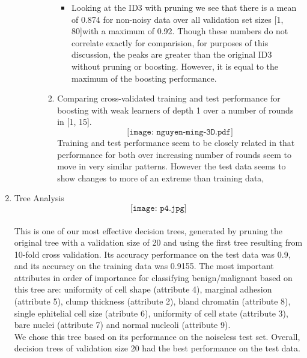 \documentclass[11pt]{article}
\begin{document}
\begin{enumerate}
\begin{enumerate}
\begin{enumerate}
\begin{enumerate}
\begin{itemize}
			\item Looking at the ID3 with pruning we see that there is a mean of 0.874 for non-noisy data over all validation set sizes [1, 80]with a maximum of 0.92. Though these numbers do not correlate exactly for comparision, for purposes of this discussion, the peaks are greater than the original ID3 without pruning or boosting. However, it is equal to the maximum of the boosting performance.
			\end{itemize}
			\item Comparing cross-validated training and test performance for boosting with weak learners of depth 1 over a number of rounds in [1, 15].
			$$\texttt{[image: nguyen-ming-3D.pdf]}$$
			Training and test performance seem to be closely related in that performance for both over increasing number of rounds seem to move in very similar patterns. However the test data seems to show changes to more of an extreme than training data, 
		\end{enumerate}
	\end{enumerate}
\end{enumerate}

\item Tree Analysis
$$\texttt{[image: p4.jpg]}$$
\\ This is one of our most effective decision trees, generated by pruning the original tree with a validation size of 20 and using the first tree resulting from 10-fold cross validation. Its accuracy performance on the test data was 0.9, and its accuracy on the training data was 0.9155. The most important attributes in order of importance for classifying benign/malignant based on this tree are: uniformity of cell shape (attribute 4), marginal adhesion (attribute 5), clump thickness (attribute 2), bland chromatin (attribute 8), single ephitelial cell size (atribute 6), uniformity of cell state (attribute 3), bare nuclei (attribute 7) and normal nucleoli (attribute 9).
\\ We chose this tree based on its performance on the noiseless test set. Overall, decision trees of validation size 20 had the best performance on the test data.

\end{enumerate}
\end{document}
